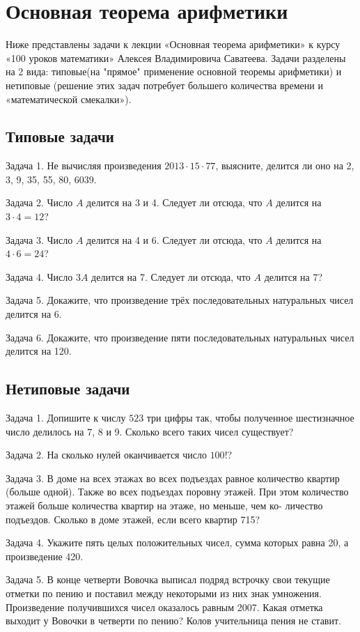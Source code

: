 \documentclass[12pt]{article}
\begin{document}
\section*{Основная теорема арифметики}

Ниже представлены задачи к лекции «Основная теорема арифметики» к курсу «100 уроков математики» Алексея Владимировича Саватеева.
Задачи разделены на 2 вида: типовые(на "прямое" применение основной теоремы арифметики) и нетиповые (решение этих задач потребует большего количества времени и «математической смекалки»).

\subsection*{Типовые задачи}

Задача 1. Не вычисляя произведения $2013\cdot15\cdot77$, выясните, делится ли оно на 2, 3, 9, 35, 55, 80, 6039.

Задача 2. Число $A$ делится на 3 и 4. Следует ли отсюда, что $A$ делится на $3\cdot4 = 12$?

Задача 3. Число $A$ делится на 4 и 6. Следует ли отсюда, что $A$ делится на $4\cdot6 = 24$?

Задача 4. Число $3A$ делится на 7. Следует ли отсюда, что $A$ делится на 7?

Задача 5. Докажите, что произведение трёх последовательных натуральных чисел делится на 6.

Задача 6. Докажите, что произведение пяти последовательных натуральных чисел делится на 120.

\subsection*{Нетиповые задачи}

Задача 1. Допишите к числу $523$ три цифры так, чтобы полученное шестизначное число делилось на 7, 8 и 9. Сколько всего таких чисел существует?

Задача 2. На сколько нулей оканчивается число $100!$?

Задача 3. В доме на всех этажах во всех подъездах равное количество квартир (больше одной). Также во всех подъездах поровну этажей. При этом количество этажей больше количества квартир на этаже, но меньше, чем ко- личество подъездов. Сколько в доме этажей, если всего квартир 715?

Задача 4. Укажите пять целых положительных чисел, сумма которых равна 20, а произведение 420.

Задача 5. В конце четверти Вовочка выписал подряд встрочку свои текущие отметки по пению и поставил между некоторыми из них знак умножения. Произведение получившихся чисел оказалось равным 2007. Какая отметка выходит у Вовочки
в четверти по пению? Колов учительница пения не ставит.
\end{document}

